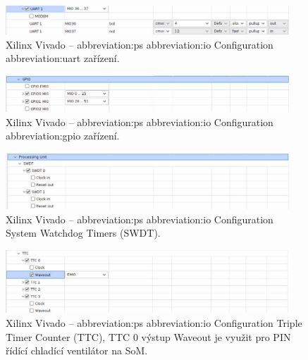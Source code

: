 \documentclass[a4paper, twoside, 11pt]{article}
\begin{document}
				\begin{figure}[htbp!]
					\centering
					\includegraphics[width=0.95\textwidth]{src/png/kr26-xilinx-vivado-flow/kr26-xilix-vivado-flow-21.jpg}
					\caption{Xilinx Vivado – \gls{abbreviation:ps} \gls{abbreviation:io} Configuration \gls{abbreviation:uart} zařízení.}
					\label{fig:kr26-xilix-vivado-flow-21}
				\end{figure}

				\begin{figure}[htbp!]
					\centering
					\includegraphics[width=0.95\textwidth]{src/png/kr26-xilinx-vivado-flow/kr26-xilix-vivado-flow-22.jpg}
					\caption{Xilinx Vivado – \gls{abbreviation:ps} \gls{abbreviation:io} Configuration \gls{abbreviation:gpio} zařízení.}
					\label{fig:kr26-xilix-vivado-flow-22}
				\end{figure}


				\begin{figure}[htbp!]
					\centering
					\includegraphics[width=0.95\textwidth]{src/png/kr26-xilinx-vivado-flow/kr26-xilix-vivado-flow-23.jpg}
					\caption{Xilinx Vivado – \gls{abbreviation:ps} \gls{abbreviation:io} Configuration System Watchdog Timers (SWDT).}
					\label{fig:kr26-xilix-vivado-flow-23}
				\end{figure}

				\begin{figure}[htbp!]
					\centering
					\includegraphics[width=0.95\textwidth]{src/png/kr26-xilinx-vivado-flow/kr26-xilix-vivado-flow-30.jpg}
					\caption{Xilinx Vivado – \gls{abbreviation:ps} \gls{abbreviation:io} Configuration Triple Timer Counter (TTC), TTC 0 výstup Waveout je využit pro PIN řídící chladící ventilátor na SoM.}
					\label{fig:kr26-xilix-vivado-flow-30}
				\end{figure}
\end{document}
